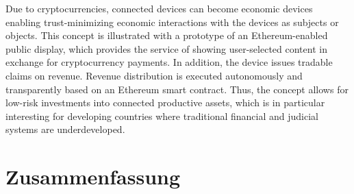 Due to cryptocurrencies, connected devices can become economic devices enabling trust-minimizing economic interactions with the devices as subjects or objects. This concept is illustrated with a prototype of an Ethereum-enabled public display, which provides the service of showing user-selected content in exchange for cryptocurrency payments. In addition, the device issues tradable claims on revenue. Revenue distribution is executed autonomously and transparently based on an Ethereum smart contract. Thus, the concept allows for low-risk investments into connected productive assets, which is in particular interesting for developing countries where traditional financial and judicial systems are underdeveloped.





%
\vfill

\pagebreak


\chapter*{Zusammenfassung}




\endgroup

\vfill
